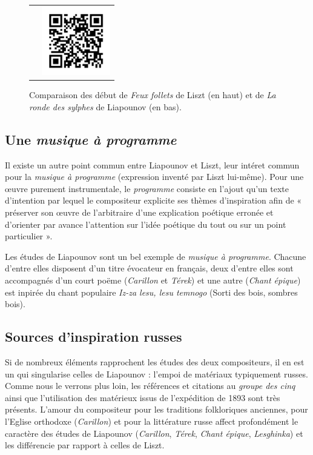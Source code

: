 \begin{figure}[!p]
\begin{bigcenter}
\begin{tabular}{lr}
      &
      \includegraphics[width=3cm, keepaspectratio]{op11-xi-qr.png}
    \end{tabular}
  \end{bigcenter}
  \caption{\label{op11-xi}Comparaison des début de \emph{Feux follets} de Liszt (en haut) et de \emph{La ronde des sylphes} de Liapounov (en bas).}
\end{figure}

\subsection{Une \emph{musique à programme}}

Il existe un autre point commun entre Liapounov et Liszt, leur intéret commun pour la \emph{musique à programme} (expression inventé par Liszt lui-même). Pour une œuvre purement instrumentale, le \emph{programme} consiste en l'ajout qu'un texte d'intention par lequel le compositeur explicite ses thèmes d'inspiration afin de « préserver son œuvre de l'arbitraire d'une explication poétique erronée et d'orienter par avance l'attention sur l'idée poétique du tout ou sur un point particulier ».

Les études de Liapounov sont un bel exemple de \emph{musique à programme}. Chacune d'entre elles disposent d'un titre évocateur en français, deux d'entre elles sont accompagnés d'un court poëme (\emph{Carillon} et \emph{Térek}) et une autre (\emph{Chant épique}) est inpirée du chant populaire \emph{Iz-za lesu, lesu temnogo} (Sorti des bois, sombres bois). 

\subsection{Sources d'inspiration russes}

Si de nombreux éléments rapprochent les études des deux compositeurs, il en est un qui singularise celles de Liapounov : l'empoi de matériaux typiquement russes. Comme nous le verrons plus loin, les références et citations au \emph{groupe des cinq} ainsi que l'utilisation des matérieux issus de l'expédition de 1893 sont très présents. L'amour du compositeur pour les traditions folkloriques anciennes, pour l'Eglise orthodoxe (\emph{Carillon}) et pour la littérature russe affect profondément le caractère des études de Liapounov (\emph{Carillon}, \emph{Térek}, \emph{Chant épique}, \emph{Lesghinka}) et les différencie par rapport à celles de Liszt.

